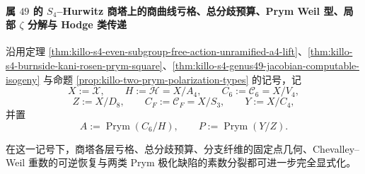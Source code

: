 \paragraph{属 \(49\) 的 \texorpdfstring{$S_4$}{S4}--Hurwitz 商塔上的商曲线亏格、总分歧预算、Prym Weil 型、局部 \texorpdfstring{$\zeta$}{zeta} 分解与 Hodge 类传递}
沿用定理 \ref{thm:killo-s4-even-subgroup-free-action-unramified-a4-lift}、\ref{thm:killo-s4-burnside-kani-rosen-prym-square}、\ref{thm:killo-s4-genus49-jacobian-computable-isogeny} 与命题 \ref{prop:killo-two-prym-polarization-types} 的记号，记
\[
X:=\mathcal X,\qquad
H:=\mathcal H=X/A_4,\qquad
C_6:=\mathcal C_6=X/V_4,
\]
\[
Z:=X/D_8,\qquad
C_F:=\mathcal C_F=X/S_3,\qquad
Y:=X/C_4,
\]
并置
\[
A:=\operatorname{Prym}(C_6/H),\qquad
P:=\operatorname{Prym}(Y/Z).
\]

在这一记号下，商塔各层亏格、总分歧预算、分支纤维的固定点几何、Chevalley--Weil 重数的可逆恢复与两类 Prym 极化缺陷的素数分裂都可进一步完全显式化。

